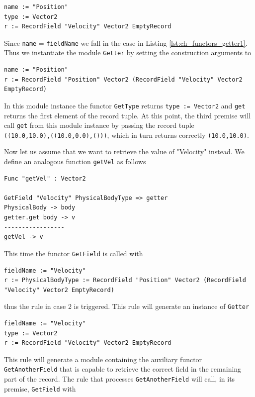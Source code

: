 \begin{lstlisting}
name := "Position"
type := Vector2
r := RecordField "Velocity" Vector2 EmptyRecord
\end{lstlisting}
 
\noindent
Since \texttt{name} = \texttt{fieldName} we fall in the case in Listing \ref{lst:ch_functors_getter1}. Thus we instantiate the module \texttt{Getter} by setting the construction arguments to 

\begin{lstlisting}
name := "Position"
r := RecordField "Position" Vector2 (RecordField "Velocity" Vector2 EmptyRecord)
\end{lstlisting}

\noindent
In this module instance the functor \texttt{GetType} returns \texttt{type :=  Vector2} and \texttt{get} returns the first element of the record tuple. At this point, the third premise will call \texttt{get} from this module instance by passing the record tuple\\ \texttt{((10.0,10.0),((10.0,0.0),()))}, which in turn returns correctly \texttt{(10.0,10.0)}.

Now let us assume that we want to retrieve the value of "Velocity" instead. We define an analogous function \texttt{getVel} as follows

\begin{lstlisting}
Func "getVel" : Vector2

GetField "Velocity" PhysicalBodyType => getter
PhysicalBody -> body
getter.get body -> v
-----------------
getVel -> v
\end{lstlisting}

\noindent
This time the functor \texttt{GetField} is called with

\begin{lstlisting}
fieldName := "Velocity"
r := PhysicalBodyType := RecordField "Position" Vector2 (RecordField "Velocity" Vector2 EmptyRecord)
\end{lstlisting}

\noindent
thus the rule in case 2 is triggered. This rule will generate an instance of \texttt{Getter}

\begin{lstlisting}
fieldName := "Velocity"
type := Vector2
r := RecordField "Velocity" Vector2 EmptyRecord
\end{lstlisting}

\noindent
This rule will generate a module containing the auxiliary functor \texttt{GetAnotherField} that is capable to retrieve the correct field in the remaining part of the record. The rule that processes \texttt{GetAnotherField} will call, in its premise, \texttt{GetField} with

